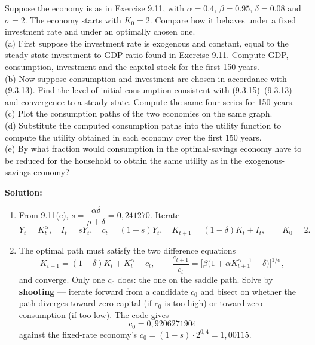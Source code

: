 \documentclass[12pt, letterpaper]{article}
\begin{document}
\begin{tcolorbox}[evenbox,title={Problem 9.12 \quad Optimal vs Fixed Savings Rates}]
\begin{tcolorbox}[questionbox]
Suppose the economy is as in Exercise 9.11, with $\alpha=0.4$, $\beta=0.95$, $\delta=0.08$ and
$\sigma=2$. The economy starts with $K_0=2$. Compare how it behaves under a fixed investment
rate and under an optimally chosen one.\\[3pt]
(a) First suppose the investment rate is exogenous and constant, equal to the steady-state
investment-to-GDP ratio found in Exercise 9.11. Compute GDP, consumption, investment and the
capital stock for the first 150 years.\\
(b) Now suppose consumption and investment are chosen in accordance with (9.3.13). Find the
level of initial consumption consistent with (9.3.15)--(9.3.13) and convergence to a steady
state. Compute the same four series for 150 years.\\
(c) Plot the consumption paths of the two economies on the same graph.\\
(d) Substitute the computed consumption paths into the utility function to compute the utility
obtained in each economy over the first 150 years.\\
(e) By what fraction would consumption in the optimal-savings economy have to be reduced for the
household to obtain the same utility as in the exogenous-savings economy?
\end{tcolorbox}

\textbf{Solution:}

\begin{enumerate}
\item From 9.11(c), $s=\dfrac{\alpha\delta}{\rho+\delta}=0{,}241270$. Iterate
\[
Y_t=K_t^{\alpha},\quad I_t=sY_t,\quad c_t=(1-s)Y_t,\quad
K_{t+1}=(1-\delta)K_t+I_t,\qquad K_0=2 .
\]

\item The optimal path must satisfy the two difference equations
\[
K_{t+1}=(1-\delta)K_t+K_t^{\alpha}-c_t,
\qquad
\frac{c_{t+1}}{c_t}=\big[\beta\big(1+\alpha K_{t+1}^{\alpha-1}-\delta\big)\big]^{1/\sigma},
\]
and converge. Only one $c_0$ does: the one on the saddle path. Solve by \textbf{shooting} ---
iterate forward from a candidate $c_0$ and bisect on whether the path diverges toward zero
capital (if $c_0$ is too high) or toward zero consumption (if too low). The code gives
\[
\boxed{\ c_0=0{,}9206271904\ }
\]
against the fixed-rate economy's $c_0=(1-s)\cdot2^{0{,}4}=1{,}00115$.


\end{enumerate}
\end{tcolorbox}
\end{document}
